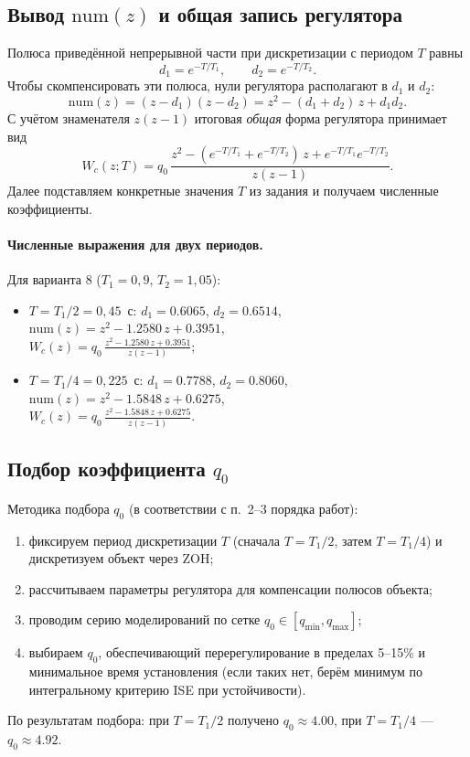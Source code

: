 \subsection{Вывод $\text{num}(z)$ и общая запись регулятора}
Полюса приведённой непрерывной части при дискретизации с периодом $T$ равны
\[
    d_1 = e^{-T/T_1},\qquad d_2 = e^{-T/T_2}.
\]
Чтобы скомпенсировать эти полюса, нули регулятора располагают в $d_1$ и $d_2$:
\[
    \text{num}(z) = (z-d_1)(z-d_2) = z^2 - (d_1{+}d_2)\,z + d_1 d_2.
\]
С учётом знаменателя $z(z-1)$ итоговая \emph{общая} форма регулятора принимает вид
\[
    W_c(z;T) = q_0\,\frac{z^2 - (e^{-T/T_1}+e^{-T/T_2})\,z + e^{-T/T_1} e^{-T/T_2}}{z(z-1)}.
\]
Далее подставляем конкретные значения $T$ из задания и получаем численные коэффициенты.

\paragraph{Численные выражения для двух периодов.}
Для варианта 8 ($T_1=0{,}9$, $T_2=1{,}05$):
\begin{itemize}
    \item $T=T_1/2=0{,}45$~с: $d_1=0.6065$, $d_2=0.6514$, $\text{num}(z)=z^2-1.2580\,z+0.3951$,\\[2pt]
    $\displaystyle W_c(z)=q_0\,\frac{z^2-1.2580\,z+0.3951}{z(z-1)}$;
    \item $T=T_1/4=0{,}225$~с: $d_1=0.7788$, $d_2=0.8060$, $\text{num}(z)=z^2-1.5848\,z+0.6275$,\\[2pt]
    $\displaystyle W_c(z)=q_0\,\frac{z^2-1.5848\,z+0.6275}{z(z-1)}$.
\end{itemize}

\subsection{Подбор коэффициента $q_0$}
Методика подбора $q_0$ (в соответствии с п.~2–3 порядка работ):
\begin{enumerate}
    \item фиксируем период дискретизации $T$ (сначала $T=T_1/2$, затем $T=T_1/4$) и дискретизуем объект через ZOH;
    \item рассчитываем параметры регулятора для компенсации полюсов объекта;
    \item проводим серию моделирований по сетке $q_0\in[q_{\min}, q_{\max}]$;
    \item выбираем $q_0$, обеспечивающий перерегулирование в пределах 5–15\% и минимальное время установления (если таких нет, берём минимум по интегральному критерию ISE при устойчивости).
\end{enumerate}
По результатам подбора: при $T=T_1/2$ получено $q_0\approx4.00$, при $T=T_1/4$ — $q_0\approx4.92$.

